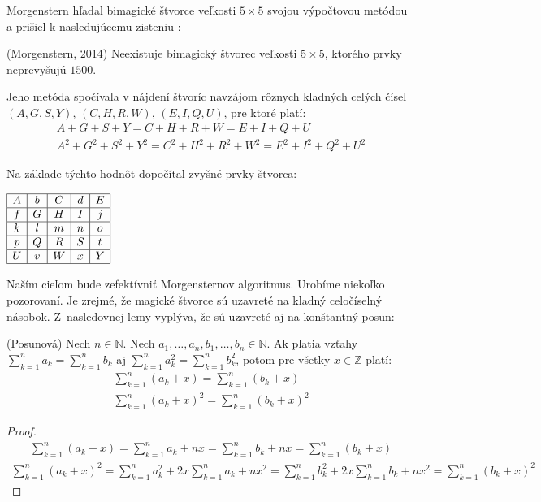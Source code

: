 Morgenstern hľadal bimagické štvorce veľkosti $5 \times 5$ svojou výpočtovou metódou a prišiel k nasledujúcemu zisteniu \cite{multimagie}:

\begin{theorem} (Morgenstern, 2014) Neexistuje bimagický štvorec veľkosti $5 \times 5$, ktorého prvky neprevyšujú $1500$.
\end{theorem}

Jeho metóda spočívala v nájdení štvoríc navzájom rôznych kladných celých čísel $(A,G,S,Y)$, $(C,H,R,W)$, $(E,I,Q,U)$, pre ktoré platí:
\begin{gather*}
A+G+S+Y = C+H+R+W = E+I+Q+U \\
A^2+G^2+S^2+Y^2 = C^2+H^2+R^2+W^2 = E^2+I^2+Q^2+U^2
\end{gather*}

Na základe týchto hodnôt dopočítal zvyšné prvky štvorca:

\begin{center}
$\begin{array}{ |c|c|c|c|c| }
\hline
A & b & C & d & E \\ 
\hline
f & G & H & I & j  \\ 
\hline
k & l & m & n & o \\ 
\hline
p & Q & R & S & t \\ 
\hline
U & v & W & x & Y \\
\hline
\end{array}$
\end{center}

Naším cieľom bude zefektívniť Morgensternov algoritmus. Urobíme niekoľko pozorovaní. Je zrejmé, že magické štvorce sú uzavreté na kladný celočíselný násobok. Z~nasledovnej lemy vyplýva, že sú uzavreté aj na konštantný posun:

\begin{lemma}
\label{pos}
(Posunová) Nech $n \in \mathbb{N}$. Nech $a_1, \dots , a_n, b_1, \dots , b_n \in \mathbb{N}$. Ak platia vzťahy $\sum_{k=1}^{n} a_k = \sum_{k=1}^{n} b_k$ aj $\sum_{k=1}^{n} a^2_k = \sum_{k=1}^{n} b^2_k$, potom pre všetky $x \in \mathbb{Z}$ platí:
\begin{gather*}
\sum_{k=1}^{n} (a_k + x) = \sum_{k=1}^{n} (b_k + x) \\
\sum_{k=1}^{n} (a_k + x)^2 = \sum_{k=1}^{n} (b_k + x)^2
\end{gather*}
\end{lemma}
 
\begin{proof}
\begin{gather*}
\sum_{k=1}^{n} (a_k + x) = \sum_{k=1}^{n} a_k + nx = \sum_{k=1}^{n} b_k + nx = \sum_{k=1}^{n} (b_k + x)
\end{gather*}
\begin{gather*}
\sum_{k=1}^{n} (a_k + x)^2 = \sum_{k=1}^{n} a^2_k + 2x \sum_{k=1}^{n} a_k + nx^2 = \sum_{k=1}^{n} b^2_k + 2x \sum_{k=1}^{n} b_k + nx^2 = \sum_{k=1}^{n} (b_k + x)^2
\end{gather*}
\end{proof}

